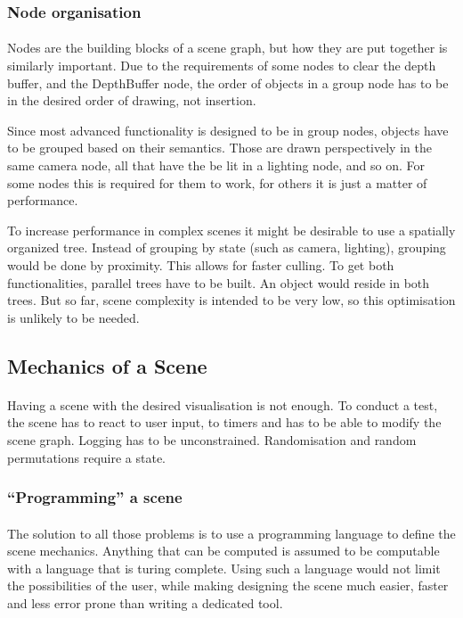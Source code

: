 \subsubsection{Node organisation}
\paragraph{}
Nodes are the building blocks of a scene graph, but how they are put together is similarly important. Due to the requirements of some nodes to clear the depth buffer, and the DepthBuffer node, the order of objects in a group node has to be in the desired order of drawing, not insertion.

Since most advanced functionality is designed to be in group nodes, objects have to be grouped based on their semantics. Those are drawn perspectively in the same camera node, all that have the be lit in a lighting node, and so on. For some nodes this is required for them to work, for others it is just a matter of performance.

To increase performance in complex scenes it might be desirable to use a spatially organized tree. Instead of grouping by state (such as camera, lighting), grouping would be done by proximity. This allows for faster culling. To get both functionalities, parallel trees have to be built. An object would reside in both trees. But so far, scene complexity is intended to be very low, so this optimisation is unlikely to be needed.


\subsection{Mechanics of a Scene\label{sceneMech}}
\paragraph{}
Having a scene with the desired visualisation is not enough. To conduct a test, the scene has to react to user input, to timers and has to be able to modify the scene graph. Logging has to be unconstrained. Randomisation and random permutations require a state.

\subsubsection{``Programming'' a scene}
\paragraph{}
The solution to all those problems is to use a programming language to define the scene mechanics. Anything that can be computed is assumed to be computable with a language that is turing complete\cite{turing}. Using such a language would not limit the possibilities of the user, while making designing the scene much easier, faster and less error prone than writing a dedicated tool.

